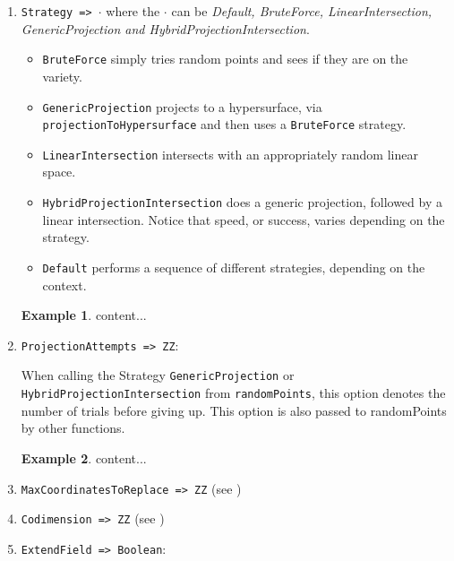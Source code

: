 \documentclass[11pt]{amsart}
\theoremstyle{definition}
\newtheorem{example}{Example}[section]
\begin{document}
\begin{enumerate}
	\vspace{1em}
	
\item {\tt Strategy => $\cdot$} where the $\cdot$ can be \textit{Default, BruteForce, LinearIntersection, GenericProjection and  HybridProjectionIntersection}.

\begin{itemize}
	\item {\tt BruteForce} simply tries random points and sees if they are on the variety.
	
	\item {\tt GenericProjection} projects to a hypersurface, via 
	{\tt projectionToHypersurface} and then uses a {\tt BruteForce} strategy.
	
	\item {\tt LinearIntersection} intersects with an appropriately random linear space.
	
	\item {\tt HybridProjectionIntersection} does a generic projection, followed by a linear intersection. Notice that speed, or success, varies depending on the strategy.
	
	\item {\tt Default} performs a sequence of different strategies, depending on the context.
\end{itemize}

\begin{example}
	content...
\end{example}
	
\item {\tt ProjectionAttempts => ZZ}: 

When calling the Strategy {\tt GenericProjection} or {\tt HybridProjectionIntersection} from {\tt randomPoints}, this option denotes the number of trials before giving up.  This option is also passed to randomPoints by other functions.

\begin{example}
	content...
\end{example}

\item {\tt MaxCoordinatesToReplace => ZZ} (see )

\vspace{1em}
\item {\tt Codimension => ZZ} (see )

\vspace{1em}
\item {\tt ExtendField => Boolean}: 


\end{enumerate}
\end{document}
